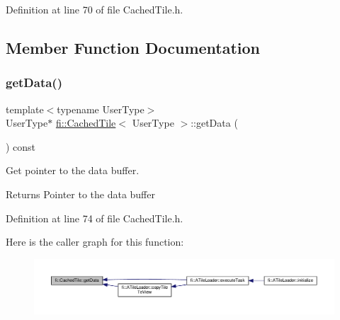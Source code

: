 Definition at line 70 of file Cached\+Tile.\+h.



\subsection{Member Function Documentation}
\mbox{\label{classfi_1_1CachedTile_addb4bbc69414fd2e04c1d6f8f9e0b8b7}} 
\subsubsection{\texorpdfstring{get\+Data()}{getData()}}
{\footnotesize\ttfamily template$<$typename User\+Type$>$ \\
User\+Type$\ast$ \hyperlink{classfi_1_1CachedTile}{fi\+::\+Cached\+Tile}$<$ User\+Type $>$\+::get\+Data (\begin{DoxyParamCaption}{ }\end{DoxyParamCaption}) const\hspace{0.3cm}{\ttfamily [inline]}}



Get pointer to the data buffer. 

\begin{DoxyReturn}{Returns}
Pointer to the data buffer 
\end{DoxyReturn}


Definition at line 74 of file Cached\+Tile.\+h.

Here is the caller graph for this function\+:
\nopagebreak
\begin{figure}[H]
\begin{center}
\leavevmode
\includegraphics[width=350pt]{d0/dbc/classfi_1_1CachedTile_addb4bbc69414fd2e04c1d6f8f9e0b8b7_icgraph}
\end{center}
\end{figure}
\mbox{\label{classfi_1_1CachedTile_a6e351e6dbc3856d4e3a944eabb615ff9}} 
